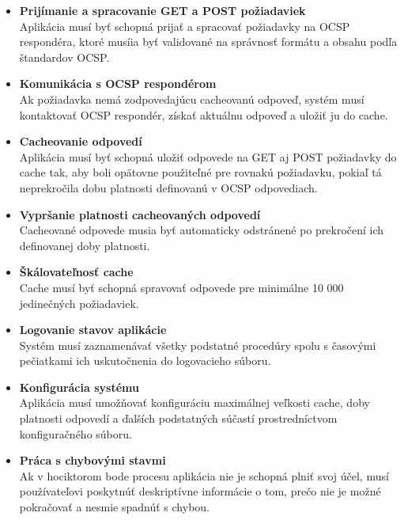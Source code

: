 \documentclass[12pt, twoside]{book}
\begin{document}
\begin{itemize}
\item \textbf{Prijímanie a spracovanie  GET a POST požiadaviek} \\
Aplikácia  musí byť schopná prijať a spracovať požiadavky na OCSP respondéra, ktoré musíia byť validované na správnosť formátu a obsahu podľa štandardov OCSP. 

\item \textbf{Komunikácia s OCSP respondérom} \\
Ak požiadavka nemá zodpovedajúcu cacheovanú odpoveď, systém musí kontaktovať OCSP respondér, získať aktuálnu odpoveď a uložiť ju do cache.

\item \textbf{Cacheovanie odpovedí} \\
Aplikácia musí byť schopná uložiť odpovede na GET aj POST požiadavky do cache tak, aby boli opätovne použiteľné pre rovnakú požiadavku, pokiaľ tá neprekročila dobu platnosti definovanú v OCSP odpovediach.

\item \textbf{Vypršanie platnosti cacheovaných odpovedí} \\
Cacheované odpovede musia byť automaticky odstránené po prekročení ich definovanej doby platnosti.

\item \textbf{Škálovateľnosť cache} \\
Cache musí byť schopná spravovať odpovede pre minimálne 10 000 jedinečných požiadaviek.

\item \textbf{Logovanie stavov aplikácie} \\
Systém musí zaznamenávať všetky podstatné procedúry spolu s časovými pečiatkami ich uskutočnenia do logovacieho súboru.

\item \textbf{Konfigurácia systému} \\
Aplikácia musí umožňovať konfiguráciu maximálnej veľkosti cache, doby platnosti odpovedí a ďalších podstatných súčastí prostredníctvom konfiguračného súboru.

\item \textbf{Práca s chybovými stavmi} \\
Ak v hociktorom bode procesu aplikácia nie je schopná plniť svoj účel, musí používateľovi poskytnúť deskriptívne informácie o tom, prečo nie je možné pokračovať a nesmie spadnúť s chybou.
\end{itemize}
\end{document}
